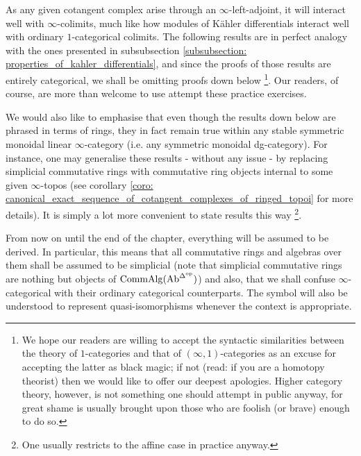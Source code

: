                 As any given cotangent complex arise through an $\infty$-left-adjoint, it will interact well with $\infty$-colimits, much like how modules of K\"ahler differentials interact well with ordinary $1$-categorical colimits. The following results are in perfect analogy with the ones presented in subsubsection \ref{subsubsection: properties_of_kahler_differentials}, and since the proofs of those results are entirely categorical, we shall be omitting proofs down below \footnote{We hope our readers are willing to accept the syntactic similarities between the theory of $1$-categories and that of $(\infty, 1)$-categories as an excuse for accepting the latter as black magic; if not (read: if you are a homotopy theorist) then we would like to offer our deepest apologies. Higher category theory, however, is not something one should attempt in public anyway, for great shame is usually brought upon those who are foolish (or brave) enough to do so.}. Our readers, of course, are more than welcome to use attempt these practice exercises.
                
                We would also like to emphasise that even though the results down below are phrased in terms of rings, they in fact remain true within any stable symmetric monoidal linear $\infty$-category (i.e. any symmetric monoidal dg-category). For instance, one may generalise these results - without any issue - by replacing simplicial commutative rings with commutative ring objects internal to some given $\infty$-topos (see corollary \ref{coro: canonical_exact_sequence_of_cotangent_complexes_of_ringed_topoi} for more details). It is simply a lot more convenient to state results this way \footnote{One usually restricts to the affine case in practice anyway.}. 
                
                \begin{convention} \label{conv: cotangent_complex_everything_is_derived}
                    From now on until the end of the chapter, everything will be assumed to be derived. In particular, this means that all commutative rings and algebras over them shall be assumed to be simplicial (note that simplicial commutative rings are nothing but objects of $\mathrm{Comm}\mathrm{Alg}(\mathrm{Ab}^{\mathrm{\Delta}^{\mathrm{op}}})$) and also, that we shall confuse $\infty$-categorical with their ordinary categorical counterparts. The symbol \say{$\cong$} will also be understood to represent quasi-isomorphisms whenever the context is appropriate.
                \end{convention}
                
